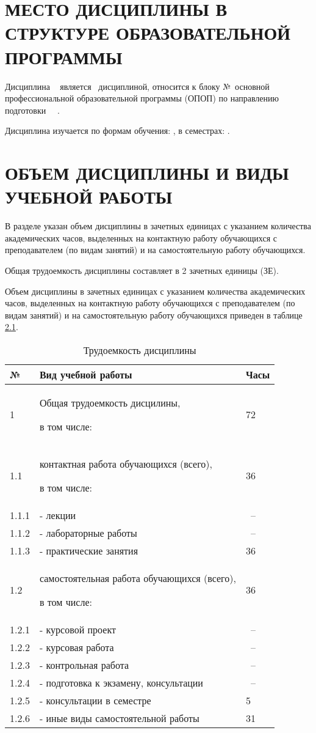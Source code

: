 \chapter{МЕСТО ДИСЦИПЛИНЫ В СТРУКТУРЕ ОБРАЗОВАТЕЛЬНОЙ ПРОГРАММЫ}\label{chapt2}

Дисциплина \DisciplineName~ является \DisciplineNeed~дисциплиной, относится к блоку №\BlockCode~основной профессиональной образовательной программы (ОПОП) по направлению подготовки 
\SpecialityCode~\SpecialityName~\OrganizationShortName.

Дисциплина изучается по формам обучения: \FormOfStudy, в семестрах: \SemestryList.

\chapter{ОБЪЕМ ДИСЦИПЛИНЫ И ВИДЫ УЧЕБНОЙ РАБОТЫ}
\label{chapt3}

В разделе указан объем дисциплины в зачетных единицах с указанием количества академических часов, выделенных на контактную работу обучающихся с преподавателем (по видам занятий) и на самостоятельную работу обучающихся.

Общая трудоемкость дисциплины составляет в 2 зачетных единицы (ЗЕ).

Объем дисциплины в зачетных единицах с указанием количества академических часов, выделенных на контактную работу обучающихся с преподавателем (по видам занятий) и на самостоятельную работу обучающихся приведен в таблице \ref{tblHours}.

\begin{table}
  \caption{Трудоемкость дисциплины}
  \label{tblHours}  
  \begin{tabularx}{\textwidth}{p{} X p{}}
  \toprule  
  № & Вид учебной работы & Часы\\
  \midrule   
  1 & Общая трудоемкость дисцилины,\par в том числе: & 72\\
  \midrule   
  1.1 & контактная работа обучающихся  (всего),\par в том числе: & 36\\  
  \midrule     
  1.1.1 & - лекции & ~--\\    
  1.1.2 & - лабораторные работы & ~--\\  
  1.1.3 & - практические занятия & 36\\    
  \midrule   
  1.2 & самостоятельная работа обучающихся (всего),\par в том числе: & 36\\    
  \midrule     
  1.2.1 & - курсовой проект & ~--\\      
  1.2.2 & - курсовая работа & ~--\\        
  1.2.3 & - контрольная работа & ~--\\          
  1.2.4 & - подготовка к экзамену, консультации & ~--\\            
  1.2.5 & - консультации в семестре & 5\\              
  1.2.6 & - иные виды самостоятельной работы & 31\\  
  \bottomrule  
  \end{tabularx}  
\end{table}

